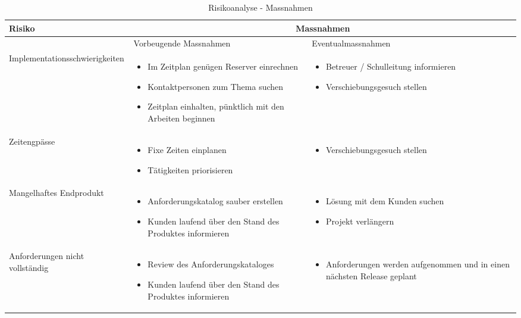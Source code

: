 \begin{table}[ht]
\centering
  \begin{tabular}{  l | p{4cm} | p{4cm} }
	\hline
	\rowcolor{darkgray}
	\textbf{Risiko}					&	\multicolumn{2}{|c|}{\textbf{Massnahmen}} \\ \hline
	\rowcolor{gray}
								&	Vorbeugende Massnahmen & Eventualmassnahmen	\\ \hline
	Implementationsschwierigkeiten
								&	\begin{itemize}
										\item Im Zeitplan genügen Reserver einrechnen
										\item Kontaktpersonen zum Thema suchen
										\item Zeitplan einhalten, pünktlich mit den Arbeiten beginnen
									\end{itemize}
								&	\begin{itemize}
										\item Betreuer / Schulleitung informieren
										\item Verschiebungsgesuch stellen
									\end{itemize}						\\ \hline
	Zeitengpässe
								&	\begin{itemize}
										\item Fixe Zeiten einplanen
										\item Tätigkeiten priorisieren
									\end{itemize}
								&	\begin{itemize}
										\item Verschiebungsgesuch stellen
									\end{itemize}	\\ \hline
	Mangelhaftes Endprodukt		
								&	\begin{itemize}
										\item Anforderungskatalog sauber erstellen
										\item Kunden laufend über den Stand des Produktes informieren
									\end{itemize}
								&	\begin{itemize}
										\item Lösung mit dem Kunden suchen
										\item Projekt verlängern
									\end{itemize}	\\ \hline	
	Anforderungen nicht vollständig	
								&	\begin{itemize}
										\item Review des Anforderungskataloges
										\item Kunden laufend über den Stand des Produktes informieren
									\end{itemize}
								&	\begin{itemize}
										\item Anforderungen werden aufgenommen und in einen nächsten Release geplant							
									\end{itemize}	\\ \hline			
  \end{tabular}
   \caption{Risikoanalyse - Massnahmen}
\end{table}


